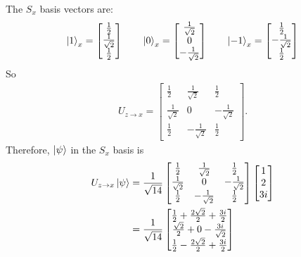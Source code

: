 \documentclass[11pt]{article}
\begin{document}
\begin{enumerate}[label=\textbf{\arabic*.}]
{\begin{enumerate}[label=\textbf{(\alph*)}]
{\begin{align*}
                    \end{align*}
                    The \(S_x\) basis vectors are:
                    \begin{equation*}
                        \ket{1}_x=\begin{bmatrix}\frac 1 2 \\ \frac{1}{\sqrt 2} \\ \frac 1 2\end{bmatrix}\qquad
                        \ket{0}_x=\begin{bmatrix}\frac{1}{\sqrt 2} \\ 0 \\ -\frac{1}{\sqrt 2}\end{bmatrix}\qquad
                        \ket{-1}_x=\begin{bmatrix}\frac 1 2 \\ -\frac{1}{\sqrt 2} \\ \frac 1 2\end{bmatrix}
                    \end{equation*}
                    So
                    \begin{align*}
                        U_{z\rightarrow x}=\begin{bmatrix}\frac 1 2 & \frac{1}{\sqrt 2} & \frac 1 2 \\ \frac{1}{\sqrt 2} & 0 & -\frac{1}{\sqrt 2} \\ \frac 1 2 & -\frac{1}{\sqrt 2} & \frac 1 2\end{bmatrix}.
                    \end{align*}
                    Therefore, \(\ket{\psi}\) in the \(S_x\) basis is
                    \begin{align*}
                        U_{z\rightarrow x}\ket{\psi}&=\frac{1}{\sqrt{14}}\begin{bmatrix}\frac 1 2 & \frac{1}{\sqrt 2} & \frac 1 2 \\ \frac{1}{\sqrt 2} & 0 & -\frac{1}{\sqrt 2} \\ \frac 1 2 & -\frac{1}{\sqrt 2} & \frac 1 2\end{bmatrix}\begin{bmatrix}1 \\ 2 \\ 3i\end{bmatrix} \\
                        &=\frac{1}{\sqrt{14}}\begin{bmatrix}\frac 1 2 +\frac{2\sqrt 2}{2}+\frac{3i}{2} \\ \frac{\sqrt 2}{2}+0-\frac{3i}{\sqrt 2} \\ \frac 1 2 -\frac{2\sqrt 2}{2}+\frac{3i}{2}\end{bmatrix} \\

\end{align*}}
\end{enumerate}}
\end{enumerate}
\end{document}
